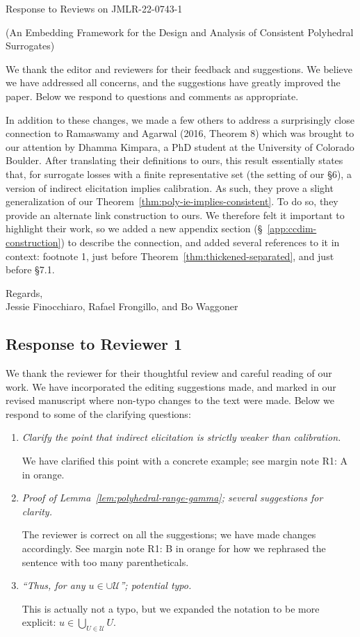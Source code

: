 \documentclass[a4paper]{article}
\begin{document}
\begin{center}
  {\Large Response to Reviews on JMLR-22-0743-1}
  
  (An Embedding Framework for the Design and Analysis of Consistent Polyhedral Surrogates)
\end{center}


We thank the editor and reviewers for their feedback and suggestions.
We believe we have addressed all concerns, and the suggestions have greatly improved the paper.
Below we respond to questions and comments as appropriate.

In addition to these changes, we made a few others to address a surprisingly close connection to Ramaswamy and Agarwal (2016, Theorem 8) which was brought to our attention by Dhamma Kimpara, a PhD student at the University of Colorado Boulder.
After translating their definitions to ours, this result essentially states that, for surrogate losses with a finite representative set (the setting of our \S 6), a version of indirect elicitation implies calibration.
As such, they prove a slight generalization of our Theorem~\ref{thm:poly-ie-implies-consistent}.
To do so, they provide an alternate link construction to ours.
We therefore felt it important to highlight their work, so we added a new appendix section (\S~\ref{app:ccdim-construction}) to describe the connection, and added several references to it in context: footnote 1, just before Theorem~\ref{thm:thickened-separated}, and just before \S 7.1.

\bigskip
Regards,\\
Jessie Finocchiaro, Rafael Frongillo, and Bo Waggoner

\subsection*{Response to Reviewer 1}

We thank the reviewer for their thoughtful review and careful reading of our work. We have incorporated the editing suggestions made, and marked in our revised manuscript where non-typo changes to the text were made. 
Below we respond to some of the clarifying questions:
\begin{enumerate}
	\item \emph{Clarify the point that indirect elicitation is strictly weaker than calibration.}
	
	We have clarified this point with a concrete example; see margin note R1: A in orange.
	
	\item \emph{Proof of Lemma~\ref{lem:polyhedral-range-gamma}; several suggestions for clarity.}
		
	The reviewer is correct on all the suggestions; we have made changes accordingly.
	See margin note R1: B in orange for how we rephrased the sentence with too many parentheticals.

	\item \emph{``Thus, for any $u \in \cup \mathcal{U}$''; potential typo.}
	
	This is actually not a typo, but we expanded the notation to be more explicit: $u \in \bigcup_{U \in \mathcal{U}} U$.
\end{enumerate}
\end{document}
